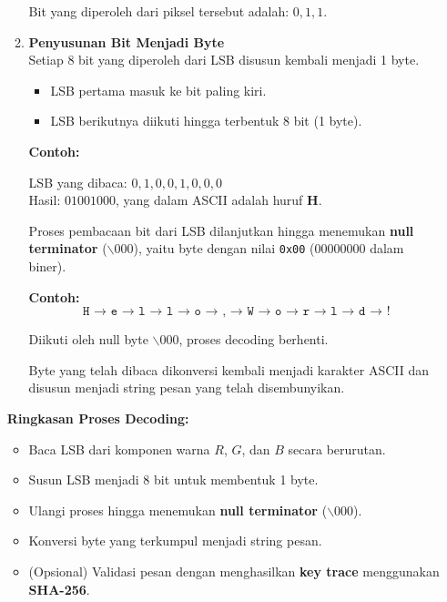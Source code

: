 \documentclass{ittelkom}
\begin{document}
\begin{enumerate}
\begin{enumerate}
                    \noindent
                    Bit yang diperoleh dari piksel tersebut adalah: $0, 1, 1$.

              \item \textbf{Penyusunan Bit Menjadi Byte} \\
                    Setiap 8 bit yang diperoleh dari LSB disusun kembali menjadi 1 byte.
                    \begin{itemize}
                        \item LSB pertama masuk ke bit paling kiri.
                        \item LSB berikutnya diikuti hingga terbentuk 8 bit (1 byte).
                    \end{itemize}

                    \noindent
                    \textbf{Contoh:}
                    \begin{center}
                        LSB yang dibaca: $0, 1, 0, 0, 1, 0, 0, 0$ \\
                        Hasil: $01001000$, yang dalam ASCII adalah huruf \textbf{H}.
                    \end{center}

                    Proses pembacaan bit dari LSB dilanjutkan hingga menemukan \textbf{null
                        terminator} ($\backslash 000$), yaitu byte dengan nilai \texttt{0x00}
                    ($00000000$ dalam biner).

                    \noindent
                    \textbf{Contoh:}
                    \[
                        \texttt{H → e → l → l → o → , → W → o → r → l → d → !}
                    \]

                    Diikuti oleh null byte $\backslash 000$, proses decoding berhenti.

                    Byte yang telah dibaca dikonversi kembali menjadi karakter ASCII dan disusun
                    menjadi string pesan yang telah disembunyikan.

          \end{enumerate}

          \noindent
          \textbf{Ringkasan Proses Decoding:}
          \begin{itemize}
              \item Baca LSB dari komponen warna $R$, $G$, dan $B$ secara berurutan.
              \item Susun LSB menjadi 8 bit untuk membentuk 1 byte.
              \item Ulangi proses hingga menemukan \textbf{null terminator} ($\backslash 000$).
              \item Konversi byte yang terkumpul menjadi string pesan.
              \item (Opsional) Validasi pesan dengan menghasilkan \textbf{key trace} menggunakan \textbf{SHA-256}.
          \end{itemize}
\end{enumerate}
\end{document}
